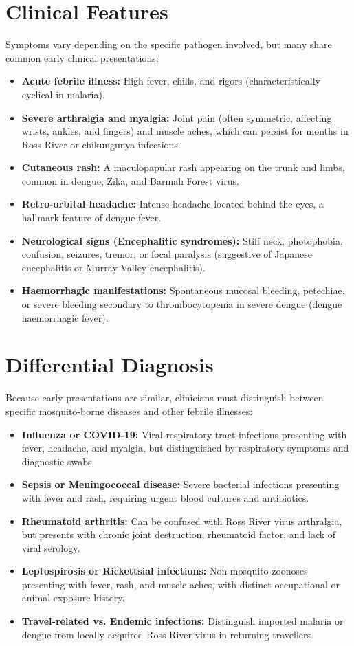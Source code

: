 \section*{Clinical Features}
Symptoms vary depending on the specific pathogen involved, but many share common early clinical presentations:
\begin{itemize}
    \item \textbf{Acute febrile illness:} High fever, chills, and rigors (characteristically cyclical in malaria).
    \item \textbf{Severe arthralgia and myalgia:} Joint pain (often symmetric, affecting wrists, ankles, and fingers) and muscle aches, which can persist for months in Ross River or chikungunya infections.
    \item \textbf{Cutaneous rash:} A maculopapular rash appearing on the trunk and limbs, common in dengue, Zika, and Barmah Forest virus.
    \item \textbf{Retro-orbital headache:} Intense headache located behind the eyes, a hallmark feature of dengue fever.
    \item \textbf{Neurological signs (Encephalitic syndromes):} Stiff neck, photophobia, confusion, seizures, tremor, or focal paralysis (suggestive of Japanese encephalitis or Murray Valley encephalitis).
    \item \textbf{Haemorrhagic manifestations:} Spontaneous mucosal bleeding, petechiae, or severe bleeding secondary to thrombocytopenia in severe dengue (dengue haemorrhagic fever).
\end{itemize}

\section*{Differential Diagnosis}
Because early presentations are similar, clinicians must distinguish between specific mosquito-borne diseases and other febrile illnesses:
\begin{itemize}
    \item \textbf{Influenza or COVID-19:} Viral respiratory tract infections presenting with fever, headache, and myalgia, but distinguished by respiratory symptoms and diagnostic swabs.
    \item \textbf{Sepsis or Meningococcal disease:} Severe bacterial infections presenting with fever and rash, requiring urgent blood cultures and antibiotics.
    \item \textbf{Rheumatoid arthritis:} Can be confused with Ross River virus arthralgia, but presents with chronic joint destruction, rheumatoid factor, and lack of viral serology.
    \item \textbf{Leptospirosis or Rickettsial infections:} Non-mosquito zoonoses presenting with fever, rash, and muscle aches, with distinct occupational or animal exposure history.
    \item \textbf{Travel-related vs. Endemic infections:} Distinguish imported malaria or dengue from locally acquired Ross River virus in returning travellers.
\end{itemize}

